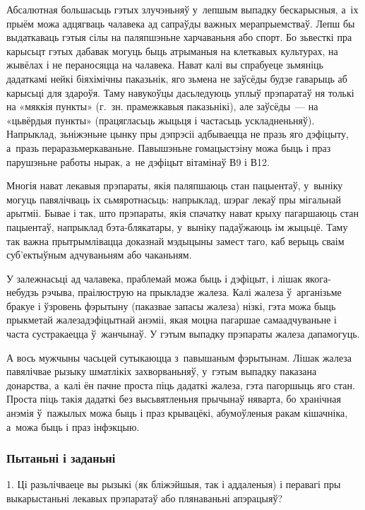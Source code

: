 Абсалютная большасьць гэтых злучэньняў у~лепшым выпадку бескарысныя, а~іх прыём можа адцягваць чалавека ад сапраўды важных мерапрыемстваў. Лепш бы выдаткаваць гэтыя сілы на паляпшэньне харчаваньня або спорт. Бо зьвесткі пра карысьцт гэтых дабавак могуць быць атрыманыя на клеткавых культурах, на жывёлах і не пераносяцца на чалавека. Нават калі вы спрабуеце зьмяніць дадаткамі нейкі біяхімічны паказьнік, яго зьмена не заўсёды будзе гаварыць аб карысьці для здароўя. Таму навукоўцы дасьледуюць уплыў прэпаратаў ня толькі на «мяккія пункты» (г.~зн. прамежкавыя паказьнікі), але заўсёды~--- на «цьвёрдыя пункты» (працягласьць жыцьця і частасьць ускладненьняў). Напрыклад, зьніжэньне цынку пры дэпрэсіі адбываецца не празь яго дэфіцыту, а~празь пераразьмеркаваньне. Павышэньне гомацыстэіну можа быць і праз парушэньне работы нырак, а~не дэфіцыт вітамінаў В9 і В12.

Многія нават лекавыя прэпараты, якія паляпшаюць стан пацыентаў, у~выніку могуць павялічваць іх сьмяротнасьць: напрыклад, шэраг лекаў пры мігальнай арытміі. Бывае і так, што прэпараты, якія спачатку нават крыху пагаршаюць стан пацыентаў, напрыклад бэта-блякатары, у~выніку падаўжаюць ім жыцьцё. Таму так важна прытрымлівацца доказнай мэдыцыны замест таго, каб верыць сваім суб'ектыўным адчуваньням або чаканьням.

У залежнасьці ад чалавека, праблемай можа быць і дэфіцыт, і лішак якога-небудзь рэчыва, праілюструю на прыкладзе жалеза. Калі жалеза ў~арганізьме бракуе і ўзровень фэрытыну (паказвае запасы жалеза) нізкі, гэта можа быць прыкметай жалезадэфіцытнай анэміі, якая моцна пагаршае самаадчуваньне і часта сустракаецца ў~жанчынаў. У гэтым выпадку прэпараты жалеза дапамогуць.

А вось мужчыны часьцей сутыкаюцца з~павышаным фэрытынам. Лішак жалеза павялічвае рызыку шматлікіх захворваньняў, у~гэтым выпадку паказана донарства, а~калі ён пачне проста піць дадаткі жалеза, гэта пагоршыць яго стан. Проста піць такія дадаткі без высьвятленьня прычынаў няварта, бо хранічная анэмія ў~пажылых можа быць і праз крывацёкі, абумоўленыя ракам кішачніка, а~можа быць і праз інфэкцыю.

\subsubsection{Пытаньні і заданьні}

1. Ці разьлічваеце вы рызыкі (як бліжэйшыя, так і аддаленыя) і перавагі пры выкарыстаньні лекавых прэпаратаў або плянаваньні апэрацыяў?

